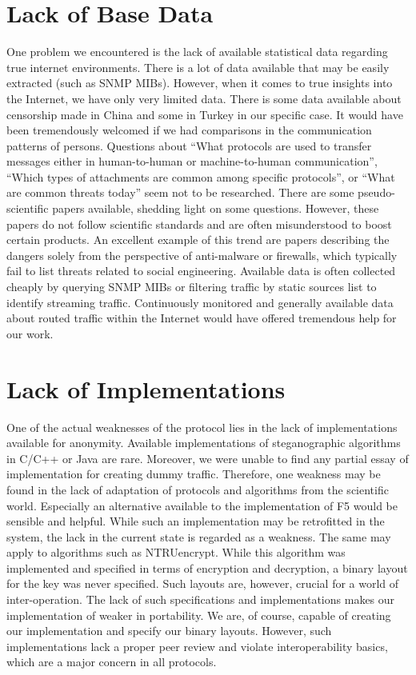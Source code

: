 \section{Lack of Base Data}

One problem we encountered is the lack of available statistical data regarding true internet environments. There is a lot of data available that may be easily extracted (such as SNMP MIBs). However, when it comes to true insights into the Internet, we have only very limited data. There is some data available about censorship made in China and some in Turkey in our specific case. It would have been tremendously welcomed if we had comparisons in the communication patterns of persons. Questions about ``What protocols are used to transfer messages either in human-to-human or machine-to-human communication'', ``Which types of attachments are common among specific protocols'', or ``What are common threats today'' seem not to be researched. There are some pseudo-scientific papers available, shedding light on some questions. However, these papers do not follow scientific standards and are often misunderstood to boost certain products. An excellent example of this trend are papers describing the dangers solely from the perspective of anti-malware or firewalls, which typically fail to list threats related to social engineering. Available data is often collected cheaply by querying SNMP MIBs or filtering traffic by static sources list to identify streaming traffic. Continuously monitored and generally available data about routed traffic within the Internet would have offered tremendous help for our work.

\section{Lack of Implementations}
One of the actual weaknesses of the protocol lies in the lack of implementations available for anonymity. Available implementations of steganographic algorithms in C/C++ or Java are rare. Moreover, we were unable to find any partial essay of implementation for creating dummy traffic. Therefore, one weakness may be found in the lack of adaptation of protocols and algorithms from the scientific world. Especially an alternative available to the implementation of F5 would be sensible and helpful. While such an implementation may be retrofitted in the system, the lack in the current state is regarded as a weakness. The same may apply to algorithms such as NTRUencrypt. While this algorithm was implemented and specified in terms of encryption and decryption, a binary layout for the key was never specified. Such layouts are, however, crucial for a world of inter-operation. The lack of such specifications and implementations makes our implementation of \MessageVortex{} weaker in portability. We are, of course, capable of creating our implementation and specify our binary layouts. However, such implementations lack a proper peer review and violate interoperability basics, which are a major concern in all protocols. 

